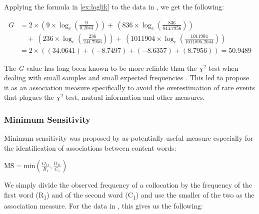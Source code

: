 Applying the formula in \ref{ex:loglik} to the data in , we get the following:

\begin{equation*}
\begin{split}
G & = 2 \times \left( 9 \times \log_e \left( \frac{9}{0.2044} \right) \right) +\ \left( 836 \times \log_e \left( \frac{836}{844.7956} \right) \right)\\
& \quad +\ \left( 236 \times \log_e \left( \frac{236}{244.7956} \right) \right) +\ \left( 1011904 \times \log_e \left( \frac{1011904}{1011895.2044} \right) \right)\\
& = 2 \times \left( \left( 34.0641 \right) + \left( -8.7497 \right) + \left( -8.6357 \right) + \left( 8.7956 \right) \right) = 50.9489
\end{split}
\end{equation*}

The \emph{G}  value has long been known to be more reliable than the $\chi^2$  test when dealing with small samples and small expected  frequencies \citep[134ff]{read_goodness--fit_1988}. This led \citet{dunning_accurate_1993} to propose it as an association  measure  specifically to avoid the overestimation of rare events that plagues the $\chi^2$  test, mutual information  and other measures.

\subsubsection{Minimum Sensitivity}
\label{sec:amminimumsensitivity}

Minimum sensitivity  was proposed by \citet{pedersen_dependent_1998} as potentially useful measure especially for the identification of associations  between content words:

\begin{exe}
\ex $\displaystyle{\text{MS} = \text{min} \left ( \frac{O_{11}}{R_1},\frac{O_{11}}{C_1} \right )}$
\label{ex:minsens}
\end{exe}

We simply divide the observed frequency  of a collocation  by the frequency of the first word (R\textsubscript{1}) and of the second word (C\textsubscript{1}) and use the smaller of the two as the association  measure.  For the data in , this gives us the following:

